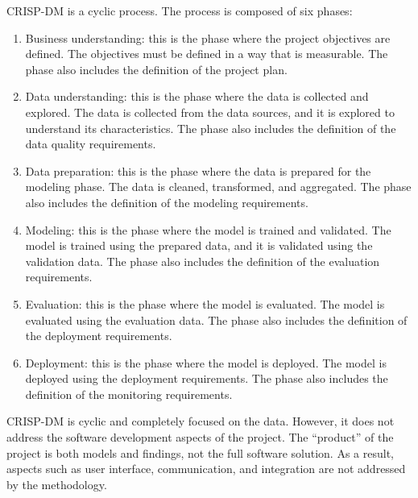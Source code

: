 CRISP-DM is a cyclic process.  The process is composed of six phases:
\begin{enumerate}
  \item Business understanding: this is the phase where the project objectives are
    defined.  The objectives must be defined in a way that is measurable.  The phase also
    includes the definition of the project plan.
  \item Data understanding: this is the phase where the data is collected and explored.
    The data is collected from the data sources, and it is explored to understand its
    characteristics.  The phase also includes the definition of the data quality
    requirements.
  \item Data preparation: this is the phase where the data is prepared for the modeling
    phase.  The data is cleaned, transformed, and aggregated.  The phase also includes the
    definition of the modeling requirements.
  \item Modeling: this is the phase where the model is trained and validated.  The model is
    trained using the prepared data, and it is validated using the validation data.  The
    phase also includes the definition of the evaluation requirements.
  \item Evaluation: this is the phase where the model is evaluated.  The model is evaluated
    using the evaluation data.  The phase also includes the definition of the deployment
    requirements.
  \item Deployment: this is the phase where the model is deployed.  The model is deployed
    using the deployment requirements.  The phase also includes the definition of the
    monitoring requirements.
\end{enumerate}

CRISP-DM is cyclic and completely focused on the data.  However, it does not address the
software development aspects of the project.  The ``product'' of the project is both
models and findings, not the full software solution.  As a result, aspects such as user
interface, communication, and integration are not addressed by the methodology.

\clearpage

